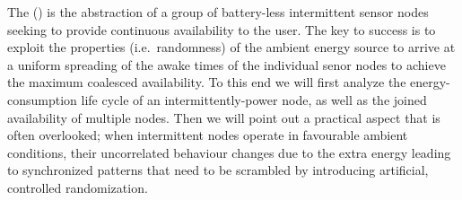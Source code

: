The \fullsys (\sys) is the abstraction of a group of battery-less intermittent sensor nodes seeking to provide continuous availability to the user. The key to success is to exploit the properties (i.e.\ randomness) of the ambient energy source to arrive at a uniform spreading of the awake times of the individual senor nodes to achieve the maximum coalesced availability. To this end we will first analyze the energy-consumption life cycle of an intermittently-power node, as well as the joined availability of multiple nodes. Then we will point out a practical aspect that is often overlooked; when intermittent nodes operate in favourable ambient conditions, their uncorrelated behaviour changes due to the extra energy leading to synchronized patterns that need to be scrambled by introducing artificial, controlled randomization.



